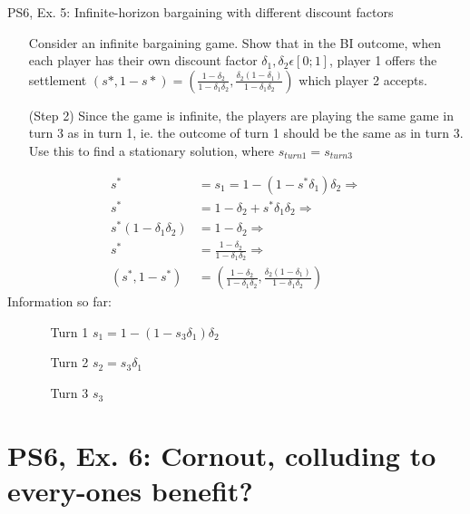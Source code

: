 \begin{frame}{PS6, Ex. 5: Infinite-horizon bargaining with different discount factors}
    \begin{itemize}
    \item[] Consider an infinite bargaining game. Show that in the BI outcome, when each player has their own discount factor $\delta_1,\delta_2 \epsilon [0;1]$, player 1 offers the settlement $ (s*,1-s*)= \left( \frac{1-\delta_2}{1-\delta_1\delta_2},\frac{\delta_2(1-\delta_1)}{1-\delta_1\delta_2}\right)$ which player 2 accepts.
    \item[(Step 2)] Since the game is infinite, the players are playing the same game in turn 3 as in turn 1, ie. the outcome of turn 1 should be the same as in turn 3. Use this to find a stationary solution, where $s_{turn1}=s_{turn3}$
    \end{itemize}
    \vfill\null
  \begin{multicols}{2}
    \begin{align*}
        s^{*}&=s_1 = 1- (1-s^{*}\delta_1)\delta_2 \Rightarrow\\
        s^{*}&= 1-\delta_2+s^{*}\delta_1\delta_2 \Rightarrow\\
        s^{*}(1-\delta_1\delta_2)&= 1-\delta_2 \Rightarrow\\
        s^{*}&= \frac{1-\delta_2}{1-\delta_1\delta_2} \Rightarrow\\
        (s^{*},1-s^{*})&= \left( \frac{1-\delta_2}{1-\delta_1\delta_2},\frac{\delta_2(1-\delta_1)}{1-\delta_1\delta_2}\right)
    \end{align*}
    \vfill\null \columnbreak
    Information so far:
    \begin{itemize}
        \item[]\vspace{-8pt}
            \begin{itemize}\normalsize
            \item[Turn 1] $s_1 = 1- (1-s_3\delta_1)\delta_2$
            \item[Turn 2] $s_2 = s_3\delta_1$
            \item[Turn 3] $s_3$
            \end{itemize}
    \end{itemize}
    \vfill\null
  \end{multicols}
    \vfill\null
\end{frame}

\section{PS6, Ex. 6: Cornout, colluding to every-ones benefit?}


